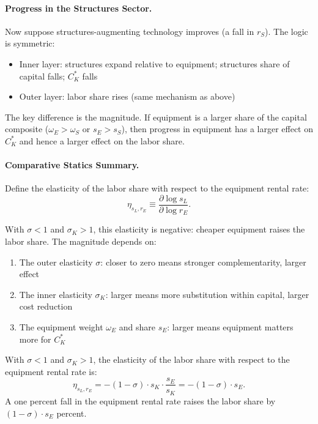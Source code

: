 \paragraph{Progress in the Structures Sector.}
Now suppose structures-augmenting technology improves (a fall in $r_S$). The logic is symmetric:
\begin{itemize}[nosep]
\item Inner layer: structures expand relative to equipment; structures share of capital falls; $C_K^*$ falls
\item Outer layer: labor share rises (same mechanism as above)
\end{itemize}

The key difference is the magnitude. If equipment is a larger share of the capital composite ($\omega_E > \omega_S$ or $s_E > s_S$), then progress in equipment has a larger effect on $C_K^*$ and hence a larger effect on the labor share.

\paragraph{Comparative Statics Summary.}
Define the elasticity of the labor share with respect to the equipment rental rate:
\begin{equation}
\eta_{s_L, r_E} \equiv \frac{\partial \log s_L}{\partial \log r_E}.
\label{eq:labor-share-elasticity}
\end{equation}

With $\sigma < 1$ and $\sigma_K > 1$, this elasticity is negative: cheaper equipment raises the labor share. The magnitude depends on:
\begin{enumerate}[nosep]
\item The outer elasticity $\sigma$: closer to zero means stronger complementarity, larger effect
\item The inner elasticity $\sigma_K$: larger means more substitution within capital, larger cost reduction
\item The equipment weight $\omega_E$ and share $s_E$: larger means equipment matters more for $C_K^*$
\end{enumerate}

\begin{proposition}
\label{prop:labor-share-equipment}
With $\sigma < 1$ and $\sigma_K > 1$, the elasticity of the labor share with respect to the equipment rental rate is:
\begin{equation}
\eta_{s_L, r_E} = -(1 - \sigma) \cdot s_K \cdot \frac{s_E}{s_K} = -(1 - \sigma) \cdot s_E.
\label{eq:eta-formula}
\end{equation}
A one percent fall in the equipment rental rate raises the labor share by $(1-\sigma) \cdot s_E$ percent.
\end{proposition}

